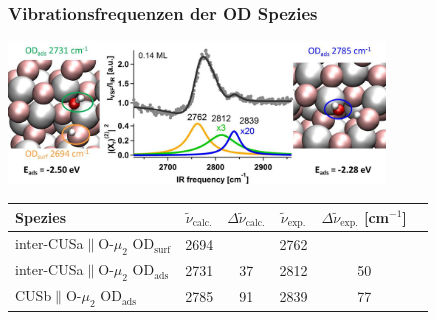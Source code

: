 \documentclass[hyperref={pdfpagelabels=false}]{beamer}
\begin{document}
\begin{frame}
\frametitle{Vibrationsfrequenzen der OD Spezies}
\begin{center}
  \includegraphics[width=0.75\textwidth]{figures/TOC_fig.jpg}
\end{center}
  \pause
  \vspace{-.3cm}
 \begin{table}[!h]
  \centering
  \begin{tabular}{l|ccc|cc}
 \toprule
 Spezies & $\tilde{\nu}_{\textrm{calc.}}$&$\Delta \tilde{\nu}_{\textrm{calc.}}$ &$\tilde{\nu}_{\textrm{exp.}}$   & $\Delta \tilde{\nu}_{\textrm{exp.}}$ [cm$^{-1}$]\\\midrule
  inter-CUSa$\parallel$O-$\mu_2$ OD$_\textrm{surf}$& 2694& & 2762& \\
  inter-CUSa$\parallel$O-$\mu_2$ OD$_\textrm{ads}$&2731 & 37 &2812 & 50\\
  CUSb$\parallel$O-$\mu_2$ OD$_\textrm{ads}$& 2785& 91 &2839 & 77 \\\bottomrule
  \end{tabular} 
\end{table}
{}
\end{frame} 
 
\end{document}
